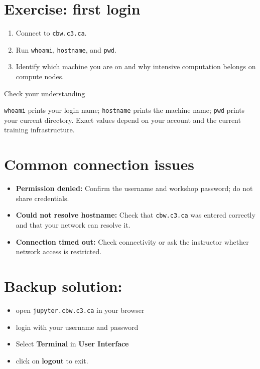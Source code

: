 \documentclass[
]{book}
\providecommand{\tightlist}{%
  \setlength{\itemsep}{0pt}\setlength{\parskip}{0pt}}
\begin{document}
\section{Exercise: first login}\label{exercise-first-login}

\begin{enumerate}
\def\labelenumi{\arabic{enumi}.}
\tightlist
\item
  Connect to \texttt{cbw.c3.ca}.
\item
  Run \texttt{whoami}, \texttt{hostname}, and \texttt{pwd}.
\item
  Identify which machine you are on and why intensive computation belongs on compute nodes.
\end{enumerate}

Check your understanding

\texttt{whoami} prints your login name; \texttt{hostname} prints the machine name; \texttt{pwd} prints your current directory. Exact values depend on your account and the current training infrastructure.

\section{Common connection issues}\label{common-connection-issues}

\begin{itemize}
\tightlist
\item
  \textbf{Permission denied:} Confirm the username and workshop password; do not share credentials.
\item
  \textbf{Could not resolve hostname:} Check that \texttt{cbw.c3.ca} was entered correctly and that your network can resolve it.
\item
  \textbf{Connection timed out:} Check connectivity or ask the instructor whether network access is restricted.
\end{itemize}

\section{Backup solution:}\label{backup-solution}

\begin{itemize}
\tightlist
\item
  open \texttt{jupyter.cbw.c3.ca} in your browser
\item
  login with your username and password
\item
  Select \textbf{Terminal} in \textbf{User Interface}
\item
  click on \textbf{logout} to exit.
\end{itemize}
\end{document}
